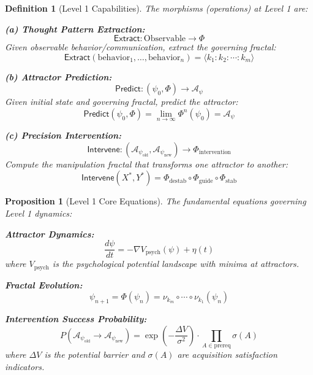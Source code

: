 \documentclass[11pt,twoside]{book}
\newcommand{\noe}[1]{\nu_{#1}}
\newcommand{\Frac}{\Phi}
\newcommand{\PsychAttractor}{\mathcal{A}_\psi}
\newtheorem{definition}{Definition}[chapter]
\newtheorem{proposition}{Proposition}[chapter]
\begin{document}
\begin{definition}[Level 1 Capabilities]
\label{def:L1-capabilities}
The morphisms (operations) at Level 1 are:

\textbf{(a) Thought Pattern Extraction:}
\begin{equation}
\boxed{
    \mathsf{Extract} : \mathrm{Observable} \to \Frac
}
\end{equation}
Given observable behavior/communication, extract the governing fractal:
\[
    \mathsf{Extract}(\text{behavior}_1, \ldots, \text{behavior}_n) =
    \langle k_1 : k_2 : \cdots : k_m \rangle
\]

\textbf{(b) Attractor Prediction:}
\begin{equation}
\boxed{
    \mathsf{Predict} : (\psi_0, \Frac) \to \PsychAttractor
}
\end{equation}
Given initial state and governing fractal, predict the attractor:
\[
    \mathsf{Predict}(\psi_0, \Frac) = \lim_{n \to \infty} \Frac^n(\psi_0) = \PsychAttractor
\]

\textbf{(c) Precision Intervention:}
\begin{equation}
\boxed{
    \mathsf{Intervene} : (\PsychAttractor_{\mathrm{old}}, \PsychAttractor_{\mathrm{new}})
    \to \Frac_{\mathrm{intervention}}
}
\end{equation}
Compute the manipulation fractal that transforms one attractor to another:
\[
    \mathsf{Intervene}(X^*, Y^*) = \Frac_{\mathrm{destab}} \circ \Frac_{\mathrm{guide}}
    \circ \Frac_{\mathrm{stab}}
\]
\end{definition}

\begin{proposition}[Level 1 Core Equations]
\label{prop:L1-equations}
The fundamental equations governing Level 1 dynamics:

\textbf{Attractor Dynamics:}
\begin{equation}
    \frac{d\psi}{dt} = -\nabla V_{\mathrm{psych}}(\psi) + \eta(t)
\end{equation}
where $V_{\mathrm{psych}}$ is the psychological potential landscape with minima at attractors.

\textbf{Fractal Evolution:}
\begin{equation}
    \psi_{n+1} = \Frac(\psi_n) = \noe{k_m} \circ \cdots \circ \noe{k_1}(\psi_n)
\end{equation}

\textbf{Intervention Success Probability:}
\begin{equation}
    P(\PsychAttractor_{\mathrm{old}} \to \PsychAttractor_{\mathrm{new}}) =
    \exp\left(-\frac{\Delta V}{\sigma^2}\right) \cdot \prod_{A \in \mathrm{prereq}} \sigma(A)
\end{equation}
where $\Delta V$ is the potential barrier and $\sigma(A)$ are acquisition satisfaction indicators.
\end{proposition}
\end{document}
